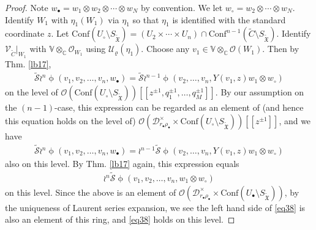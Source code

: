 \documentclass[12pt,a4paper,notitlepage]{article}
\theoremstyle{definition}
\theoremstyle{plain}
\newcommand{\fk}{\mathfrak}
\newcommand{\mc}{\mathcal}
\newcommand{\wtd}{\widetilde}
\newcommand{\Conf}{\mathrm{Conf}}
\newcommand{\scr}{\mathscr}
\newcommand{\blt}{\bullet}
\newcommand{\Vbb}{\mathbb V}
\newcommand{\Cbb}{\mathbb C}
\newcommand{\SXtd}{S_{\wtd{\fk X}}}
\numberwithin{equation}{section}
\begin{document}
\begin{proof}
Note $w_\blt=w_1\otimes w_2\otimes\cdots\otimes w_N$ by convention. We let $w_\circ=w_2\otimes\cdots \otimes w_N$. Identify $W_1$ with $\eta_1(W_1)$ via $\eta_1$ so that $\eta_1$ is identified with the standard coordinate $z$. Let $\Conf(U_\circ\setminus\SXtd)=(U_2\times\cdots\times U_n)\cap\Conf^{n-1}(\wtd C\setminus\SXtd)$. Identify $\scr V_{\wtd C}|_{W_1}$ with $\Vbb\otimes_\Cbb\scr O_{W_1}$ using $\mc U_\varrho(\eta_1)$. Choose any $v_1\in\Vbb\otimes_\Cbb\scr O(W_1)$. Then by Thm. \ref{lb17},
\begin{align*}
\wtd{\mc S}\wr^n\upphi(v_1,v_2,\dots,v_n,w_\blt)=\wtd{\mc S}\wr^{n-1}\upphi(v_2,\dots,v_n,Y(v_1,z)w_1\otimes w_\circ)	
\end{align*}
on the level of $\scr O(\Conf(U_\circ\setminus\SXtd))[[z^{\pm 1},q_1^{\pm1},\dots,q_M^{\pm1}]]$. By our assumption on the $(n-1)$-case, this expression can be regarded as an element of (and hence this equation holds on the level of) $\scr O(\mc D_{r_\blt\rho_\blt}^\times\times\Conf(U_\circ\setminus\SXtd))[[z^{\pm 1}]]$, and we have
\begin{align*}
\wtd{\mc S}\wr^n\upphi(v_1,v_2,\dots,v_n,w_\blt)=\wr^{n-1}\wtd{\mc S}\upphi(v_2,\dots,v_n,Y(v_1,z)w_1\otimes w_\circ)	
\end{align*}
also on this level. By Thm. \ref{lb17} again, this expression equals
\begin{align*}
\wr^n\wtd{\mc S}\upphi(v_1,v_2,\dots,v_n,w_1\otimes w_\circ)	
\end{align*}
on this level. Since the above is an element of $\scr O(\mc D_{r_\blt\rho_\blt}^\times\times\Conf(U_\blt\setminus\SXtd))$, by the uniqueness of Laurent series expansion, we see the left hand side of \eqref{eq38} is also an element of this ring, and \eqref{eq38} holds on this level.
\end{proof}
\end{document}
